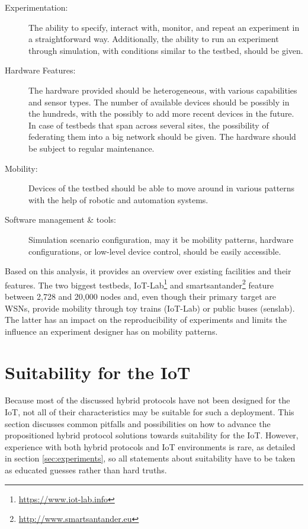\documentclass[a4paper,10pt]{scrartcl}
\begin{document}
\begin{description}
\item[Experimentation:] The ability to specify, interact with, monitor, and repeat an experiment in a straightforward way. Additionally, the ability to run an experiment through simulation, with conditions similar to the testbed, should be given.
\item[Hardware Features:] The hardware provided should be heterogeneous, with various capabilities and sensor types. The number of available devices should be possibly in the hundreds, with the possibly to add more recent devices in the future. In case of testbeds that span across several sites, the possibility of federating them into a big network should be given. The hardware should be subject to regular maintenance.
\item[Mobility:] Devices of the testbed should be able to move around in various patterns with the help of robotic and automation systems.
\item[Software management \& tools:] Simulation scenario configuration, may it be mobility patterns, hardware configurations, or low-level device control, should be easily accessible.
\end{description}
Based on this analysis, it provides an overview over existing facilities and their features. The two biggest testbeds, IoT-Lab\footnote{\url{https://www.iot-lab.info}} and smartsantander\footnote{\url{http://www.smartsantander.eu}} feature between 2,728 and 20,000 nodes and, even though their primary target are \glspl{WSN}, provide mobility through toy trains (IoT-Lab) or public buses (senslab). The latter has an impact on the reproducibility of experiments and limits the influence an experiment designer has on mobility patterns.

\section{Suitability for the IoT}
\label{sec:suitability}

Because most of the discussed hybrid protocols have not been designed for the IoT, not all of their characteristics may be suitable for such a deployment. This section discusses common pitfalls and possibilities on how to advance the propositioned hybrid protocol solutions towards suitability for the IoT. However, experience with both hybrid protocols and IoT environments is rare, as detailed in section \ref{sec:experiments}, so all statements about suitability have to be taken as educated guesses rather than hard truths.\\
\end{document}
